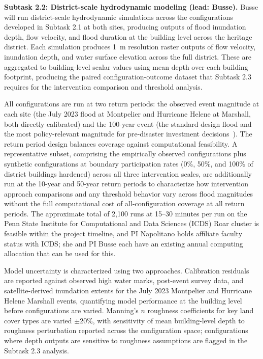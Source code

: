\documentclass[11pt]{article}
\begin{document}
\textbf{Subtask 2.2: District-scale hydrodynamic modeling (lead: Busse).}
Busse will run district-scale hydrodynamic simulations across the configurations
developed in Subtask 2.1 at both sites, producing outputs of flood inundation
depth, flow velocity, and flood duration at the building level across the
heritage district.
Each simulation produces 1~m resolution raster outputs of flow velocity, inundation
depth, and water surface elevation across the full district.
These are aggregated to building-level scalar values using mean depth over each
building footprint, producing the paired configuration-outcome dataset that
Subtask 2.3 requires for the intervention comparison and threshold analysis.

All configurations are run at two return periods: the observed event magnitude
at each site (the July 2023 flood at Montpelier and Hurricane Helene at
Marshall, both directly calibrated) and the 100-year event (the standard design
flood and the most policy-relevant magnitude for pre-disaster investment
decisions~\cite{CFR44_59}).
The return period design balances coverage against computational feasibility.
A representative subset, comprising the empirically observed configurations plus
synthetic configurations at boundary participation rates (0\%, 50\%, and 100\% of
district buildings hardened) across all three intervention scales, are additionally
run at the 10-year and 50-year return periods to characterize how intervention
approach comparisons and any threshold behavior vary across flood magnitudes
without the full computational cost of all-configuration coverage at all return
periods.
The approximate total of 2,100 runs at 15--30 minutes per run on the Penn State
Institute for Computational and Data Sciences (ICDS) Roar cluster is feasible
within the project timeline, and PI Napolitano holds affiliate faculty status
with ICDS; she and PI Busse each have an existing annual computing allocation
that can be used for this.

Model uncertainty is characterized using two approaches.
Calibration residuals are reported against observed high water marks, post-event
survey data, and satellite-derived inundation extents for the July 2023 Montpelier
and Hurricane Helene Marshall events, quantifying model performance at the
building level before configurations are varied.
Manning's $n$ roughness coefficients for key land cover types are varied
$\pm$20\%, with sensitivity of mean building-level depth to roughness perturbation
reported across the configuration space; configurations where depth outputs are
sensitive to roughness assumptions are flagged in the Subtask 2.3 analysis.
\end{document}
